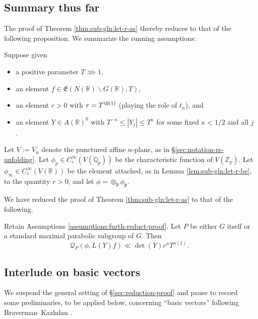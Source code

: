 \subsection{Summary thus far}\label{sec:summary-thus-far}
The proof of Theorem \ref{thm:sub-gln:let-r-as} thereby reduces to that of the following proposition.  We summarize the running assumptions:
\begin{assumptions}\label{assumptions:furth-reduct-proof}
  Suppose given
  \begin{itemize}
  \item a positive parameter $T \ggg 1$,
  \item an element $f \in \mathfrak{E}(N(\mathbb{R}) \backslash G(\mathbb{R}), T)$,
  \item an element $r > 0$ with $r =T^{\O(1)}$ (playing the role of $t_n$), and
  \item an element $Y \in A(\mathbb{R})^0$ with $T^{-\kappa} \leq |Y_j| \leq T^{\kappa}$ for some fixed $\kappa < 1/2$ and all $j$.
  \end{itemize}
  Let $V := V_n$ denote the punctured affine $n$-plane, as in \S\ref{sec:notation-rs-unfolding}.  Let $\phi_p \in C_c^\infty(V(\mathbb{Q}_p))$ be the characteristic function of $V(\mathbb{Z}_p)$.  Let $\phi_\infty \in C_c^\infty(V(\mathbb{R}))$ be the element attached, as in Lemma \ref{lem:sub-gln:let-r-be}, to the quantity $r > 0$, and let $\phi = \otimes_{\mathfrak{p}} \phi_\mathfrak{p}$.
\end{assumptions}


We have reduced the proof of Theorem \ref{thm:sub-gln:let-r-as} to that of the following.
\begin{proposition}\label{prop:bound-after-theta-degenerate-case-2}
  Retain Assumptions \ref{assumptions:furth-reduct-proof}.  Let $P$ be either $G$ itself or a standard maximal parabolic subgroup of $G$.  Then
  \begin{equation*}
    \mathcal{Q}_P(\phi,L(Y) f)
    \ll
    \det(Y) r^{n} T^{o(1)}.
  \end{equation*}
\end{proposition}


\subsection{Interlude on basic vectors}\label{sec:interl-basic-vect}
We suspend the general setting of \S\ref{sec:reduction-proof} and pause to record some preliminaries, to be applied below, concerning ``basic vectors'' following Braverman--Kazhdan \cite[\S3.12]{MR1694894}.

